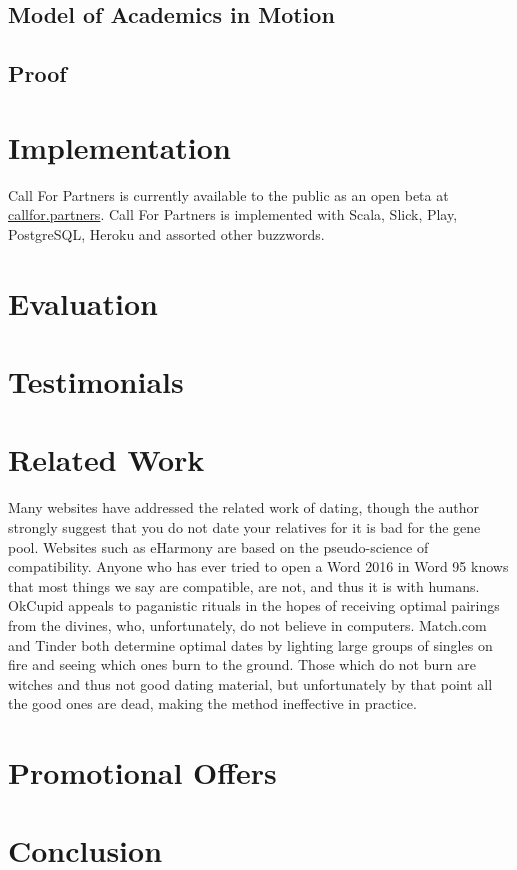 \documentclass{article}
\begin{document}
\subsection{Model of Academics in Motion}
\subsection{Proof}



\section{Implementation}
Call For Partners is currently available to the public as an open beta at \url{callfor.partners}.
Call For Partners is implemented with Scala, Slick, Play, PostgreSQL, Heroku and assorted other buzzwords.



\section{Evaluation}

\section{Testimonials}

\section{Related Work}
Many websites have addressed the related work of dating, though the author strongly suggest that you do not date your relatives for it is bad for the gene pool.
Websites such as eHarmony are based on the pseudo-science of compatibility.
Anyone who has ever tried to open a Word 2016 in Word 95 knows that most things we say are compatible, are not, and thus it is with humans.
OkCupid appeals to paganistic rituals in the hopes of receiving optimal pairings from the divines, who, unfortunately, do not believe in computers.
Match.com and Tinder both determine optimal dates by lighting large groups of singles on fire and seeing which ones burn to the ground.
Those which do not burn are witches and thus not good dating material, but unfortunately by that point all the good ones are dead, making the method ineffective in practice.

\section{Promotional Offers}

\section{Conclusion}
\end{document}

